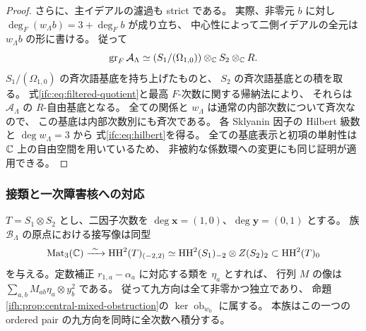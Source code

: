 \begin{proof}
さらに、主イデアルの濾過も strict である。
実際、非零元 $b$ に対し
$\deg_F(w_\Lambda b)=3+\deg_F b$ が成り立ち、
中心性によって二側イデアルの全元は $w_\Lambda b$ の形に書ける。
従って
\begin{equation}\label{ifc:eq:filtered-quotient}
 \operatorname{gr}_F\mathcal A_\Lambda
        \simeq (S_1/(\Omega_{1,0}))\otimes_\mathbb C S_2\otimes_\mathbb C R.
\end{equation}
$S_1/(\Omega_{1,0})$ の斉次語基底を持ち上げたものと、
$S_2$ の斉次語基底との積を取る。
式\eqref{ifc:eq:filtered-quotient}と最高 $F$-次数に関する帰納法により、
それらは $\mathcal A_\Lambda$ の $R$-自由基底となる。
全ての関係と $w_\Lambda$ は通常の内部次数について斉次なので、
この基底は内部次数別にも斉次である。
各 Sklyanin 因子の Hilbert 級数と $\deg w_\Lambda=3$ から
式\eqref{ifc:eq:hilbert}を得る。
全ての基底表示と初項の単射性は $\mathbb C$ 上の自由空間を用いているため、
非被約な係数環への変更にも同じ証明が適用できる。
\end{proof}

\subsubsection{接類と一次障害核への対応}

\begin{proposition}[九つの混合方向の独立性]
\label{ifc:prop:tangent}
$T=S_1\otimes S_2$ とし、二因子次数を
$\deg\mathbf x=(1,0)$、$\deg\mathbf y=(0,1)$ とする。
族 $\mathcal B_\Lambda$ の原点における接写像は同型
\begin{equation}\label{ifc:eq:tangent}
 \operatorname{Mat}_3(\mathbb C)
   \xrightarrow{\ \sim\ }
 \operatorname{HH}^2(T)_{(-2,2)}
   \simeq \operatorname{HH}^2(S_1)_{-2}\otimes Z(S_2)_2
       \subset\operatorname{HH}^2(T)_0
\end{equation}
を与える。定数補正 $r_{1,a}-\alpha_a$ に対応する類を $\eta_a$ とすれば、
行列 $M$ の像は $\sum_{a,b}M_{ab}\eta_a\otimes y_b^2$ である。
従って九方向は全て非零かつ独立であり、
命題\ref{ifh:prop:central-mixed-obstruction}の
$\ker\operatorname{ob}_{w_0}$ に属する。
本族はこの一つの ordered pair の九方向を同時に全次数へ積分する。
\end{proposition}

